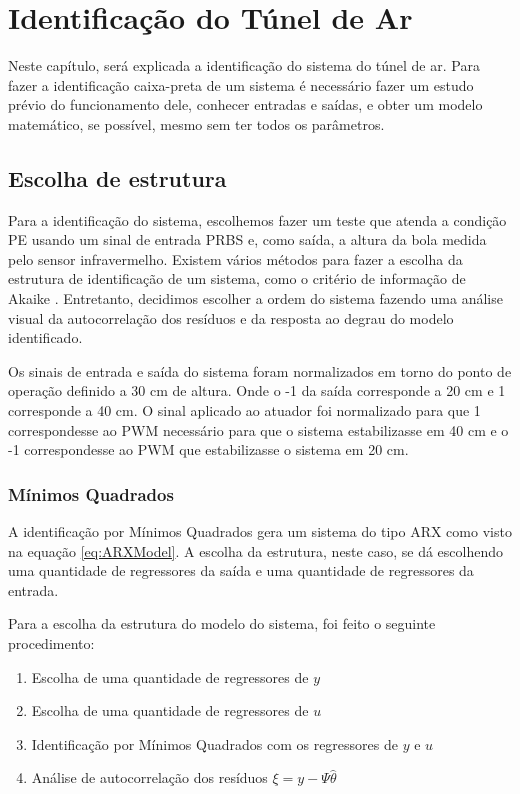 \chapter{Identificação do Túnel de Ar} \label{cap4}

Neste capítulo, será explicada a identificação do sistema do túnel de ar. Para fazer a identificação caixa-preta de um sistema é necessário fazer um estudo prévio do funcionamento dele, conhecer entradas e saídas, e obter um modelo matemático, se possível, mesmo sem ter todos os parâmetros.
\section{Escolha de estrutura}
Para a identificação do sistema, escolhemos fazer um teste que atenda a condição PE \cite{katayama2005} usando um sinal de entrada PRBS e, como saída, a altura da bola medida pelo sensor infravermelho. Existem vários métodos para fazer a escolha da estrutura de identificação de um sistema, como o critério de informação de Akaike \cite{akaike1974}. Entretanto, decidimos escolher a ordem do sistema fazendo uma análise visual da autocorrelação dos resíduos e da resposta ao degrau do modelo identificado.


Os sinais de entrada e saída do sistema foram normalizados em torno do ponto de operação definido a 30 cm de altura. Onde o -1 da saída corresponde a 20 cm e 1 corresponde a 40 cm. O sinal aplicado ao atuador foi normalizado para que 1 correspondesse ao PWM necessário para que o sistema estabilizasse em 40 cm e o -1 correspondesse ao PWM que estabilizasse o sistema em 20 cm.


\subsection{Mínimos Quadrados}\label{s:4mq}

A identificação por Mínimos Quadrados gera um sistema do tipo ARX como visto na equação \eqref{eq:ARXModel}. A escolha da estrutura, neste caso, se dá escolhendo uma quantidade de regressores da saída e uma quantidade de regressores da entrada. 


Para a escolha da estrutura do modelo do sistema, foi feito o seguinte procedimento:
\begin{enumerate}
	\item Escolha de uma quantidade de regressores de $y$
	\item Escolha de uma quantidade de regressores de $u$
	\item Identificação por Mínimos Quadrados com os regressores de $y$ e $u$
	\item Análise de autocorrelação dos resíduos $\xi=y-\Psi \hat{\theta}$
\end{enumerate}

